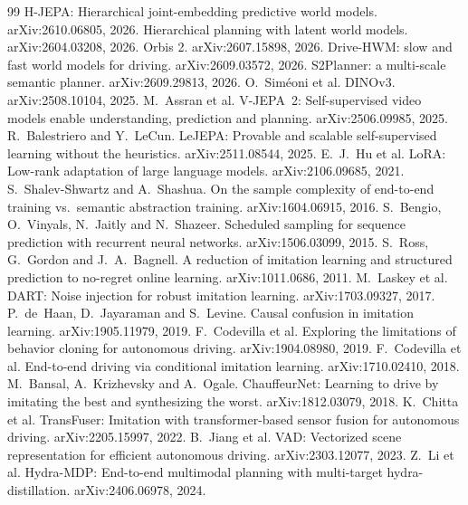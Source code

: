 \documentclass[10pt,twocolumn]{article}
\theoremstyle{remark}
\begin{document}
\begin{thebibliography}{99}\footnotesize\setlength{\itemsep}{0.5pt}\setlength{\parsep}{0pt}
 H-JEPA: Hierarchical joint-embedding predictive world models. arXiv:2610.06805, 2026.
 Hierarchical planning with latent world models. arXiv:2604.03208, 2026.
 Orbis 2. arXiv:2607.15898, 2026.
 Drive-HWM: slow and fast world models for driving. arXiv:2609.03572, 2026.
 S2Planner: a multi-scale semantic planner. arXiv:2609.29813, 2026.
 O.~Sim\'eoni et al. DINOv3. arXiv:2508.10104, 2025.
 M.~Assran et al. V-JEPA~2: Self-supervised video models enable understanding, prediction and planning. arXiv:2506.09985, 2025.
 R.~Balestriero and Y.~LeCun. LeJEPA: Provable and scalable self-supervised learning without the heuristics. arXiv:2511.08544, 2025.
 E.~J.~Hu et al. LoRA: Low-rank adaptation of large language models. arXiv:2106.09685, 2021.
 S.~Shalev-Shwartz and A.~Shashua. On the sample complexity of end-to-end training vs.\ semantic abstraction training. arXiv:1604.06915, 2016.
 S.~Bengio, O.~Vinyals, N.~Jaitly and N.~Shazeer. Scheduled sampling for sequence prediction with recurrent neural networks. arXiv:1506.03099, 2015.
 S.~Ross, G.~Gordon and J.~A.~Bagnell. A reduction of imitation learning and structured prediction to no-regret online learning. arXiv:1011.0686, 2011.
 M.~Laskey et al. DART: Noise injection for robust imitation learning. arXiv:1703.09327, 2017.
 P.~de~Haan, D.~Jayaraman and S.~Levine. Causal confusion in imitation learning. arXiv:1905.11979, 2019.
 F.~Codevilla et al. Exploring the limitations of behavior cloning for autonomous driving. arXiv:1904.08980, 2019.
 F.~Codevilla et al. End-to-end driving via conditional imitation learning. arXiv:1710.02410, 2018.
 M.~Bansal, A.~Krizhevsky and A.~Ogale. ChauffeurNet: Learning to drive by imitating the best and synthesizing the worst. arXiv:1812.03079, 2018.
 K.~Chitta et al. TransFuser: Imitation with transformer-based sensor fusion for autonomous driving. arXiv:2205.15997, 2022.
 B.~Jiang et al. VAD: Vectorized scene representation for efficient autonomous driving. arXiv:2303.12077, 2023.
 Z.~Li et al. Hydra-MDP: End-to-end multimodal planning with multi-target hydra-distillation. arXiv:2406.06978, 2024.

\end{thebibliography}
\end{document}
